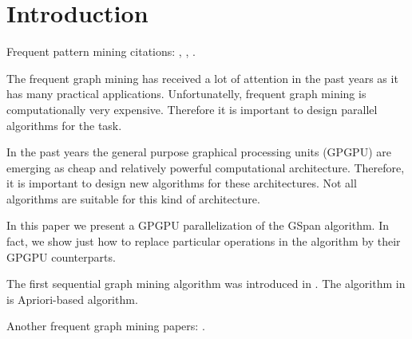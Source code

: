 \section{Introduction}

Frequent pattern mining citations: \cite{agrawal94fast},
\cite{han00mining}, \cite{zaki97newalgorithms}.

The frequent graph mining has received a lot of attention in the past
years as it has many practical applications. Unfortunatelly, frequent
graph mining is computationally very expensive. Therefore it is
important to design parallel algorithms for the task.

In the past years the general purpose graphical processing units
(GPGPU) are emerging as cheap and relatively powerful computational
architecture. Therefore, it is important to design new algorithms for
these architectures. Not all algorithms are suitable for this kind of
architecture. 

In this paper we present a GPGPU parallelization of the GSpan
algorithm. In fact, we show just how to replace particular operations
in the algorithm by their GPGPU counterparts.

The first sequential graph mining algorithm was introduced in
\cite{kuramochi2001frequent}. The algorithm in
\cite{kuramochi2001frequent} is Apriori-based algorithm.

Another frequent graph mining papers: \cite{gspan}.


